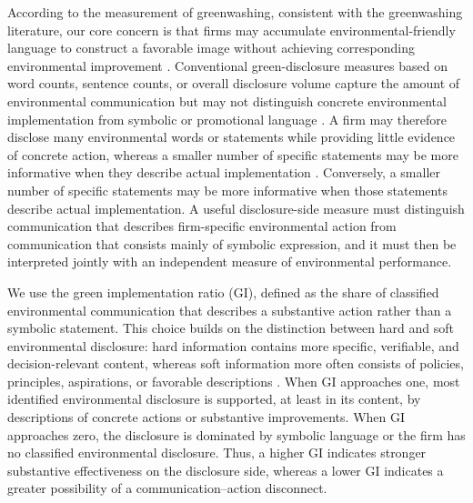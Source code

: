\documentclass[11pt]{article}
\begin{document}
According to the measurement of greenwashing,
consistent with the greenwashing literature, our core concern is that firms may accumulate environmental-friendly language to construct a favorable image without achieving corresponding environmental improvement \citep{delmas2011drivers,lyon2011greenwash,marquis2016scrutiny}.
Conventional green-disclosure measures based on word counts, sentence counts, or overall disclosure volume capture the amount of environmental communication but may not distinguish concrete environmental implementation from symbolic or promotional language \citep{clarkson2008revisiting,hummel2016relationship,xu2026deepgreen}.
A firm may therefore disclose many environmental words or statements while providing little evidence of concrete action, whereas a smaller number of specific statements may be more informative when they describe actual implementation \citep{clarkson2008revisiting,marquis2016scrutiny}.
Conversely, a smaller number of specific statements may be more informative when those statements describe actual implementation. 
A useful disclosure-side measure must distinguish communication that describes firm-specific environmental action from communication that consists mainly of symbolic expression, 
and it must then be interpreted jointly with an independent measure of environmental performance.

We use the green implementation ratio (GI)\citep{xu2026deepgreen}, defined as the share of classified environmental communication that describes a substantive action rather than a symbolic statement. 
This choice builds on the distinction between hard and soft environmental disclosure: 
hard information contains more specific, verifiable, and decision-relevant content, 
whereas soft information more often consists of policies, principles, aspirations, or favorable descriptions \citep{clarkson2008revisiting,hummel2016relationship}. 
When GI approaches one, most identified environmental disclosure is supported, at least in its content, by descriptions of concrete actions or substantive improvements. 
When GI approaches zero, the disclosure is dominated by symbolic language or the firm has no classified environmental disclosure. 
Thus, a higher GI indicates stronger substantive effectiveness on the disclosure side, whereas a lower GI indicates a greater possibility of a communication--action disconnect. 
\end{document}
